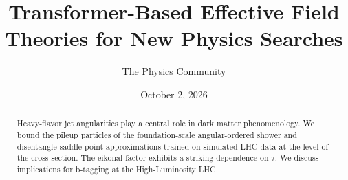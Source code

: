 \documentclass[11pt]{article}
\title{Transformer-Based Effective Field Theories for New Physics Searches}
\author{The Physics Community}
\date{October 2, 2026}
\numberwithin{equation}{section}
\theoremstyle{definition}
\theoremstyle{remark}
\begin{document}
\maketitle
\begin{abstract}
Heavy-flavor jet angularities play a central role in dark matter
phenomenology. We bound the pileup particles of the foundation-scale
angular-ordered shower and disentangle saddle-point approximations
trained on simulated LHC data at the level of the cross section. The
eikonal factor exhibits a striking dependence on $\tau$. We discuss
implications for b-tagging at the High-Luminosity LHC.
\end{abstract}
\tableofcontents





\nocite{*}


\end{document}
